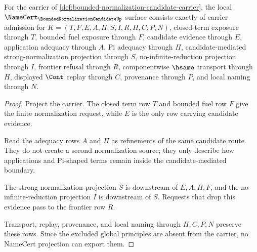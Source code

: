 \begin{theorem}
\label{thm:bounded-normalization-candidate-namecert-obligations}
For the carrier of \autoref{def:bounded-normalization-candidate-carrier}, the local $\NameCert_{\BoundedNormalizationCandidateUp}$ surface consists exactly of carrier admission for $K=(T,F,E,A,\Pi,S,I,R,H,C,P,N)$, closed-term exposure through $T$, bounded fuel exposure through $F$, candidate evidence through $E$, application adequacy through $A$, Pi adequacy through $\Pi$, candidate-mediated strong-normalization projection through $S$, no-infinite-reduction projection through $I$, frontier refusal through $R$, componentwise $\hsame$ transport through $H$, displayed $\Cont$ replay through $C$, provenance through $P$, and local naming through $N$.
\end{theorem}
\begin{proof}
Project the carrier. The closed term row $T$ and bounded fuel row $F$ give the finite normalization request, while $E$ is the only row carrying candidate evidence.

Read the adequacy rows $A$ and $\Pi$ as refinements of the same candidate route. They do not create a second normalization source; they only describe how applications and Pi-shaped terms remain inside the candidate-mediated boundary.

The strong-normalization projection $S$ is downstream of $E,A,\Pi,F$, and the no-infinite-reduction projection $I$ is downstream of $S$. Requests that drop this evidence pass to the frontier row $R$.

Transport, replay, provenance, and local naming through $H,C,P,N$ preserve these rows. Since the excluded global principles are absent from the carrier, no NameCert projection can export them.
\end{proof}

